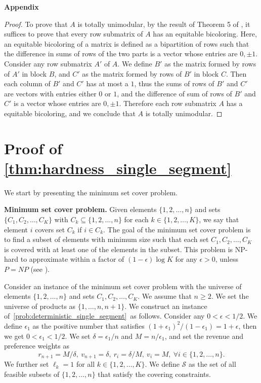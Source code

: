 \documentclass[msom,non-blindrev]{informs3} %
\theoremstyle{definition}
\begin{document}
\begin{appendices}{\Large \noindent\textbf{Appendix}}
\begin{proof}
To prove that $A$ is totally unimodular, by the result of Theorem 5 of \cite{tamir1975totally}, it suffices to prove that every row submatrix of $A$ has an equitable bicoloring. Here, an equitable bicoloring of a matrix is defined as a bipartition of rows such that the difference in sums of rows of the two parts is a vector whose entries are $0,\pm 1$. Consider any row submatrix $A'$ of $A$. We define  $B'$ as the matrix formed by rows of $A'$ in block $B$, and $C'$ as the matrix formed by rows of $B'$ in block $C$. Then each column of $B'$ and $C'$ has at most a $1$, thus the sums of rows of $B'$ and $C'$ are vectors with entries either $0$ or $1$, and the difference of sum of rows of $B'$ and $C'$ is a vector whose entries are $0,\pm 1$. Therefore each row submatrix $A$ has a equitable bicoloring, and we conclude that $A$ is totally unimodular.
\end{proof}

\section{Proof of \cref{thm:hardness_single_segment}} \label{sec:thm:hardness_single_segment}

We start by presenting the minimum set cover problem.

    \noindent\textbf{Minimum set cover problem.} Given elements $\{1,2,\dots,n\}$ and sets $\{C_1,C_2,\dots,C_K\}$ with $C_k\subseteq\{1,2,\dots,n\}$ for each $k\in\{1,2,\dots,K\}$, we say that element $i$ covers set $C_k$ if $i\in C_k$. The goal of the minimum set cover problem is to find a subset of elements with minimum size such that each set $C_1,C_2,\dots,C_K$ is covered with at least one of the elements in the subset. This problem is NP-hard to approximate within a factor of $(1-\epsilon)\log K$ for any $\epsilon>0$, unless $P=NP$ (see \citealt{dinur2014analytical}).

	Consider an instance of the minimum set cover problem with the universe of elements $\{1,2,\dots,n\}$ and sets $C_1,C_2,\dots,C_K$. We assume that $n\geq 2$. We set the universe of products as $\{1,\dots,n,n+1\}$. We construct an instance of~\eqref{prob:deterministic_single_segment}~as follows. Consider any $0<\epsilon<1/2$. We define $\epsilon_1$ as the positive number that satisfies $(1+\epsilon_1)^2/(1-\epsilon_1)=1+\epsilon$, then we get $0<\epsilon_1<1/2$. We set $\delta=\epsilon_1/n$ and $M=n/\epsilon_1$, and set the revenue and preference weights as 
    \begin{equation*}
    r_{n+1}=M/\delta,\ v_{n+1}=\delta,\ r_i=\delta/M,\ v_i=M,\ \forall i\in\{1,2,\dots,n\}.
    \end{equation*}
    We further set $\ell_k=1$ for all $k\in\{1,2,\dots,K\}$. We define $\mathcal{S}$ as the set of all feasible subsets of $\{1,2,\dots,n\}$ that satisfy the covering constraints.
		

\end{appendices}
\end{document}
